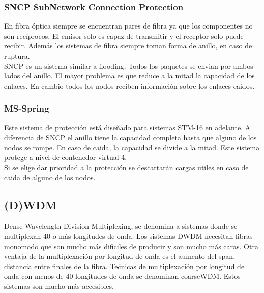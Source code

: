 \subsubsection{\acrshort{SNCP} SubNetwork Connection Protection}
En fibra óptica siempre se encuentran pares de fibra ya que los componentes no son recíprocos. El emisor solo es capaz de transmitir y el receptor solo puede recibir. Además los sistemas de fibra siempre toman forma de anillo, en caso de ruptura.\\
\acrshort{SNCP} es un sistema similar a flooding. Todos los paquetes se envian por ambos lados del anillo. El mayor problema es que reduce a la mitad la capacidad de los enlaces. En cambio todos los nodos reciben información sobre los enlaces caidos.
\subsubsection{MS-Spring}
Este sistema de protección está diseñado para sistemas STM-16 en adelante. A diferencia de \acrshort{SNCP} el anillo tiene la capacidad completa hasta que alguno de los nodos se rompe. En caso de caida, la capacidad se divide a la mitad. Este sistema protege a nivel de contenedor virtual 4. \\
Si se elige dar prioridad a la protección se descartarán cargas utiles en caso de caida de alguno de los nodos.
\subsection{(D)\acrshort{WDM}}
Dense Wavelength Division Multiplexing, se denomina a sistemas donde se multiplexan 40 o más longitudes de onda. Los sistemas DWDM necesitan fibras monomodo que son mucho más dificiles de producir y son mucho más caras. Otra ventaja de la multiplexación por longitud de onda es el aumento del span, distancia entre finales de la fibra. Tećnicas de multiplexación por longitud de onda con menos de 40 longitudes de onda se denominan coarseWDM. Estos sistemas son mucho más accesibles.